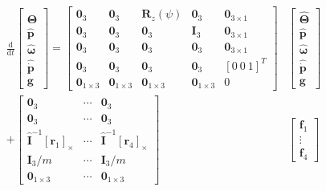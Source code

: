 \documentclass{article}
\begin{document}
\begin{align}
    \frac{\mathrm{d}}{\mathrm{d} t}\left[
    \begin{array}{c}
        \hat{\mathbf\Theta} \\
        \hat{\mathbf{p}} \\
        \hat{\mathbf{\omega}} \\
        \hat{\dot{\mathbf{p}}}\\
        \mathbf g
    \end{array}
    \right]=
    \left[
    \begin{array}{lllll}
        \mathbf{0}_{3} & \mathbf{0}_{3} & \mathbf{R}_{z}(\psi) & \mathbf{0}_{3} & \mathbf 0_{3\times 1}\\
        \mathbf{0}_{3} & \mathbf{0}_{3} & \mathbf{0}_{3} & \mathbf{I}_{3} & \mathbf 0_{3\times 1}\\
        \mathbf{0}_{3} & \mathbf{0}_{3} & \mathbf{0}_{3} & \mathbf{0}_{3} & \mathbf 0_{3\times 1}\\
        \mathbf{0}_{3} & \mathbf{0}_{3} & \mathbf{0}_{3} & \mathbf{0}_{3} & [0\ 0\ 1]^T\\
        \mathbf{0}_{1\times 3} & \mathbf{0}_{1\times 3} & \mathbf{0}_{1\times 3} & \mathbf{0}_{1\times 3} & 0
    \end{array}
    \right]&\left[
    \begin{array}{c}
        \hat{\mathbf{\Theta}} \\
        \hat{\mathbf{p}} \\
        \hat{\mathbf \omega} \\
        \hat{\dot{\mathbf{p}}}\\
        \mathbf g
    \end{array}\right]\\
    +\left[
    \begin{array}{lll}
        \mathbf{0}_{3} & \cdots & \mathbf{0}_{3} \\
        \mathbf{0}_{3} & \cdots & \mathbf{0}_{3} \\
        \hat{\mathbf{I}}^{-1}\left[\mathbf{r}_{1}\right]_{\times} & \cdots & \hat{\mathbf{I}}^{-1}\left[\mathbf{r}_{4}\right]_\times \\
        \mathbf{I}_{3} / m & \cdots & \mathbf{I}_{3} / m\\
        \mathbf{0}_{1\times 3}&\cdots&\mathbf{0}_{1\times 3}
    \end{array}
    \right]
    &\left[\begin{array}{c}
    \mathbf{f}_{1} \\
    \vdots \\
    \mathbf{f}_{4}
    \end{array}\right]
\end{align}
\end{document}
